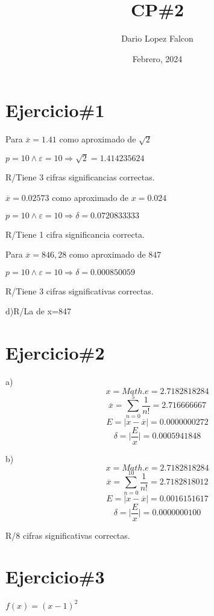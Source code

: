 \documentclass[a4paper,12pt]{article}
\begin{document}
\title{CP\#2}
\author{Dario Lopez Falcon}
\date{Febrero, 2024}
\maketitle

\section*{Ejercicio\#1}


\begin{center}
    Para $\overline{x}=1.41$ como aproximado de $\sqrt{2}$
    
    $p=10 \wedge  \varepsilon=10 \Rightarrow  \sqrt{2}=1.414235624$

    R/Tiene 3 cifras significancias correctas.\[\]

    \(\overline{x}=0.02573\) como aproximado de \(x=0.024\)

    $p=10 \wedge  \varepsilon=10 \Rightarrow  \delta =0.0720833333$

    R/Tiene 1 cifra significancia correcta.\[\]
    
    Para $\overline{x}=846,28$ como aproximado de $847$

    $p=10 \wedge  \varepsilon=10 \Rightarrow  \delta=0.000850059$

    R/Tiene 3 cifras significativas correctas.\[\]

    d)R/La de x=847

\end{center}

\section*{Ejercicio\#2}
a)
\[x=Math.e=2.7182818284\]
\[\overline{x}=\sum_{n = 0}^{5}\frac{1}{n!}=2.716666667\]
\[E=\vert x-\overline{x}\vert = 0.0000000272\]
\[\delta = \vert \frac{E}{x}\vert =0.0005941848\]

b)
\[x=Math.e=2.7182818284\]
\[\overline{x}=\sum_{n = 0}^{10}\frac{1}{n!}=2.7182818012\]
\[E=\vert x-\overline{x}\vert = 0.0016151617\]
\[\delta = \vert \frac{E}{x}\vert =0.0000000100\]

R/8 cifras significativas correctas.

\section*{Ejercicio\#3}

\(f(x)=(x-1)^2\)
\end{document}
